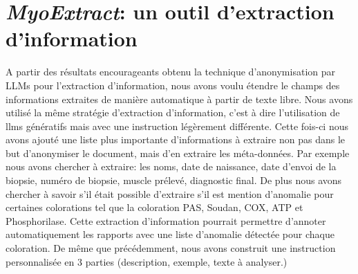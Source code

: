 \section{\textit{MyoExtract}: un outil d'extraction d'information}
A partir des résultats encourageants obtenu la technique d'anonymisation par LLMs pour l'extraction d'information, nous avons voulu étendre le champs des informations extraites de manière automatique à partir de texte libre. Nous avons utilisé la même stratégie d'extraction d'information, c'est à dire l'utilisation de \gls{llms} génératifs mais avec une instruction légèrement différente. Cette fois-ci nous avons ajouté une liste plus importante d'informations à extraire non pas dans le but d'anonymiser le document, mais d'en extraire les méta-données. Par exemple nous avons chercher à extraire: les noms, date de naissance, date d'envoi de la biopsie, numéro de biopsie, muscle prélevé, diagnostic final. De plus nous avons chercher à savoir s'il était possible d'extraire s'il est mention d'anomalie pour certaines colorations tel que la coloration PAS, Soudan, COX, ATP et Phosphorilase. Cette extraction d'information pourrait permettre d'annoter automatiquement les rapports avec une liste d'anomalie détectée pour chaque coloration. De même que précédemment, nous avons construit une instruction personnalisée en 3 parties (description, exemple, texte à analyser.)

